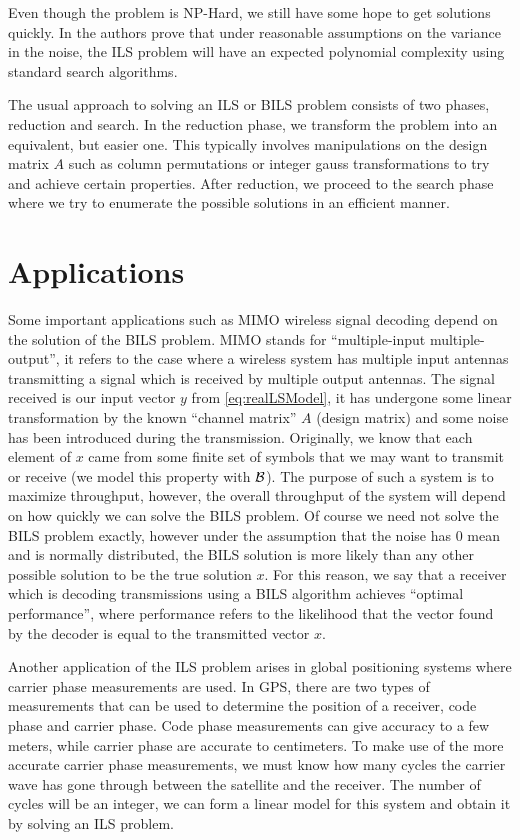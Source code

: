 \documentclass[12pt,Bold,letterpaper]{mcgilletdclass}
\newcommand{\boxcon}{{\cal B}}
\begin{document}
Even though the problem is NP-Hard, we still have some hope to get solutions
quickly. In \cite{HasV05} the authors prove that under reasonable assumptions
on the variance in the noise, the ILS problem will have an expected polynomial complexity using standard search algorithms.

The usual approach to solving an ILS or BILS problem consists of two phases,
reduction and search. In the reduction phase, we transform the problem into an
equivalent, but easier one. This typically involves manipulations on the design matrix $A$ such as column permutations
or integer gauss transformations to try and achieve certain properties. After reduction, we proceed to the search phase where we try to enumerate the possible solutions in an efficient manner.

\section{Applications}

Some important applications such as MIMO wireless signal decoding depend on the
solution of the BILS problem. MIMO stands for ``multiple-input
multiple-output'', it refers to the case where a wireless system has multiple
input antennas transmitting a signal which is received by multiple output
antennas. The signal received is our input vector $y$ from
\eqref{eq:realLSModel}, it has undergone some linear transformation by the known
``channel matrix'' $A$ (design matrix) and some noise has been introduced during
the transmission. Originally, we know that each element of $x$ came from some
finite set of symbols that we may want to transmit or receive (we model
this property with $\boxcon$). The purpose of such a system is to maximize
throughput, however, the overall throughput of the system will depend on how
quickly we can solve the BILS problem. Of course we need not solve the BILS
problem exactly, however under the assumption that the noise has $0$ mean and is
normally distributed, the BILS solution is more likely than any other possible
solution to be the true solution $x$. For this reason, we say that a receiver which is decoding transmissions using a BILS algorithm achieves ``optimal performance'', where performance refers to the likelihood that the vector found by the decoder is equal to the transmitted vector $x$.

Another application of the ILS problem arises in global positioning systems where carrier phase measurements are used. In GPS, there are two types of measurements that can be used to determine the position of a receiver, code phase and carrier phase. Code phase measurements can give accuracy to a few meters, while carrier phase are accurate to centimeters. To make use of the more accurate carrier phase measurements, we must know how many cycles the carrier wave has gone through between the satellite and the receiver. The number of cycles will be an integer, we can form a linear model for this system and obtain it by solving an ILS problem. 
\end{document}
